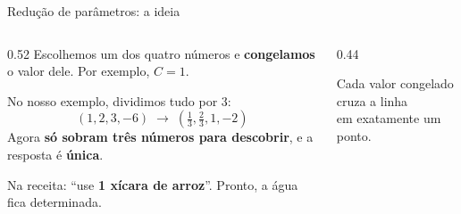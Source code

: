 \documentclass[aspectratio=169,11pt]{beamer}
\newcommand{\bnum}[1]{\textbf{\textcolor{mTeal}{#1}}}
\begin{document}
\begin{frame}{Redução de parâmetros: a ideia}
  \begin{columns}[c]
    \begin{column}{0.52\textwidth}
      Escolhemos um dos quatro números e \textcolor{corReducao}{\textbf{congelamos}} o valor dele.
      Por exemplo, $C = 1$.
      \bigskip

      No nosso exemplo, dividimos tudo por 3:
      \[ (1, 2, 3, -6) \;\longrightarrow\; \left(\tfrac13, \tfrac23, 1, -2\right) \]
      Agora \bnum{só sobram três números para descobrir}, e a resposta é \bnum{única}.
      \bigskip

      Na receita: ``use \textbf{1 xícara de arroz}''. Pronto, a água fica determinada.
    \end{column}
    \begin{column}{0.44\textwidth}
      \centering
      \smallskip

      {\scriptsize\textcolor{mStoneMid}{Cada valor congelado cruza a linha\\em exatamente um ponto.}}
    \end{column}
  \end{columns}
\end{frame}
\end{document}

